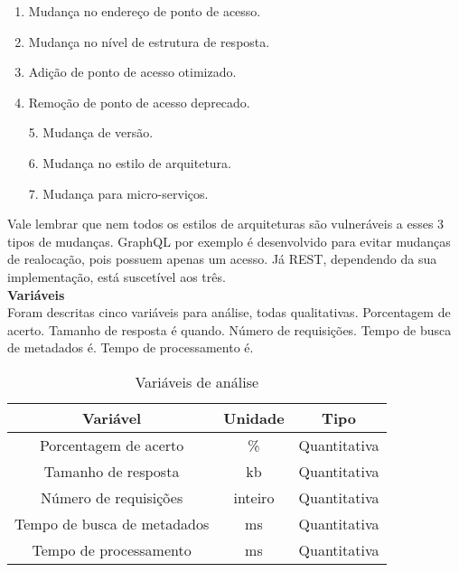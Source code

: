 \begin{description}[leftmargin=8em,style=nextline]
  \item[\textbf{Realocação}] 
  \begin{enumerate}
  \item Mudança no endereço de ponto de acesso.
  \item Mudança no nível de estrutura de resposta.
  \item Adição de ponto de acesso otimizado.
  \item Remoção de ponto de acesso deprecado.
  \end{enumerate}
  \item[\textbf{Transição}] 
  \begin{enumerate}
  \item[5.] Mudança de versão.
  \item[6.] Mudança no estilo de arquitetura.
  \end{enumerate}
  \item[\textbf{Composição}]
  \begin{enumerate}
  \item[7.] Mudança para micro-serviços.
  \end{enumerate}
\end{description}

Vale lembrar que nem todos os estilos de arquiteturas são vulneráveis a esses 3 tipos de mudanças. GraphQL por exemplo é desenvolvido para evitar mudanças de realocação, pois possuem apenas um acesso. Já REST, dependendo da sua implementação, está suscetível aos três. \\

\textbf{Variáveis} \\

Foram descritas cinco variáveis para análise, todas qualitativas.  Porcentagem de acerto. Tamanho de resposta é quando. Número de requisições. Tempo de busca de metadados é. Tempo de processamento é.

\begin{table}[H]
  \centering
  \begin{tabular}{|c|c|c|}
    \hline
    Variável & Unidade & Tipo \\
    \hline
    Porcentagem de acerto & \% & Quantitativa \\
    \hline
    Tamanho de resposta & kb & Quantitativa \\
    \hline
    Número de requisições & inteiro & Quantitativa \\
    \hline
    Tempo de busca de metadados & ms & Quantitativa \\
    \hline
    Tempo de processamento & ms & Quantitativa \\
    \hline
  \end{tabular}
  \caption{Variáveis de análise}
\end{table}

 
 
 
 
 
 

 
